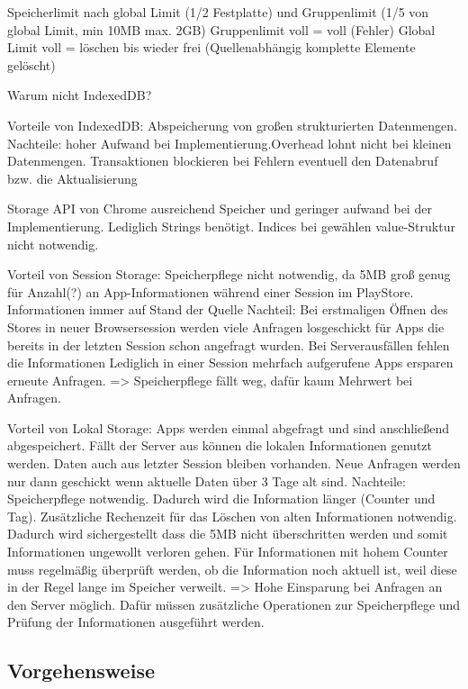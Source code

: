 Speicherlimit nach global Limit (1/2 Festplatte) und Gruppenlimit (1/5 von global Limit, min 10MB max. 2GB)
Gruppenlimit voll = voll (Fehler)
Global Limit voll = löschen bis wieder frei (Quellenabhängig komplette Elemente gelöscht)

Warum nicht IndexedDB?

Vorteile von IndexedDB: Abspeicherung von großen strukturierten Datenmengen.
Nachteile: hoher Aufwand bei Implementierung.Overhead lohnt nicht bei kleinen Datenmengen. Transaktionen blockieren bei Fehlern  eventuell den Datenabruf bzw. die Aktualisierung

Storage API von Chrome ausreichend Speicher und geringer aufwand bei der Implementierung. Lediglich Strings benötigt. Indices bei gewählen value-Struktur nicht notwendig.

Vorteil von Session Storage: Speicherpflege nicht notwendig, da 5MB groß genug für Anzahl(?) an App-Informationen während einer Session im PlayStore. Informationen immer auf Stand der Quelle
Nachteil: Bei erstmaligen Öffnen des Stores in neuer Browsersession werden viele Anfragen losgeschickt für Apps die bereits in der letzten Session schon angefragt wurden. Bei Serverausfällen fehlen die Informationen
Lediglich in einer Session mehrfach aufgerufene Apps ersparen erneute Anfragen.
=> Speicherpflege fällt weg, dafür kaum Mehrwert bei Anfragen.

Vorteil von Lokal Storage: Apps werden einmal abgefragt und sind anschließend abgespeichert. Fällt der Server aus können die lokalen Informationen genutzt werden. Daten auch aus letzter Session bleiben vorhanden. Neue Anfragen werden nur dann geschickt wenn aktuelle Daten über 3 Tage alt sind.
Nachteile: Speicherpflege notwendig. Dadurch wird die Information länger (Counter und Tag). Zusätzliche Rechenzeit für das Löschen von alten Informationen notwendig. Dadurch wird sichergestellt dass die 5MB nicht überschritten werden und somit Informationen ungewollt verloren gehen. Für Informationen mit hohem Counter muss regelmäßig überprüft werden, ob die Information noch aktuell ist, weil diese in der Regel lange im Speicher verweilt.
=> Hohe Einsparung bei Anfragen an den Server möglich. Dafür müssen zusätzliche Operationen zur Speicherpflege und Prüfung der Informationen ausgeführt werden.

\subsection{Vorgehensweise}
\label{ss:vorgehensweise}


